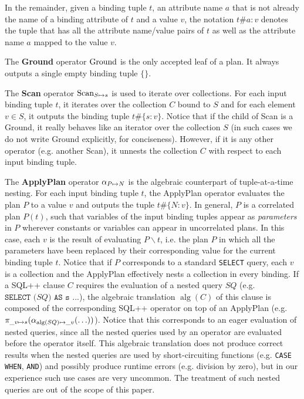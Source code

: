 In the remainder, given a binding tuple $t$, an attribute name $a$ that is not already the name of a binding attribute of $t$ and a value $v$, the notation $t\#{a : v}$ denotes the tuple that has all the attribute name/value pairs of $t$ as well as the attribute name $a$ mapped to the value $v$.

The \textbf{Ground} operator $\operatorname{Ground}$ is the only accepted leaf of a plan. It always outputs a single empty binding tuple $\{ \}$. 

The \textbf{Scan} operator $\operatorname{Scan}_{S \mapsto s}$ is used to iterate over collections. For each input binding tuple $t$, it iterates over the collection $C$ bound to $S$ and for each element $v \in S$, it outputs the binding tuple $t \# \{ s:v \}$. Notice that if the child of Scan is a Ground, it really behaves like an iterator over the collection $S$ (in such cases we do not write Ground explicitly, for conciseness). However, if it is any other operator (e.g. another Scan), it unnests the collection $C$ with respect to each input binding tuple.

The \textbf{ApplyPlan} operator $\alpha_{P \mapsto N}$ is the algebraic counterpart of tuple-at-a-time nesting. For each input binding tuple $t$, the ApplyPlan operator evaluates the plan $P$ to a value $v$ and outputs the tuple $t \# \{ N: v \}$. In general, $P$ is a correlated plan $P(t)$, such that variables of the input binding tuples appear as \textit{parameters} in $P$ wherever constants or variables can appear in uncorrelated plans. In this case, each $v$ is the result of evaluating $P\backslash t$, i.e. the plan $P$ in which all the parameters have been replaced by their corresponding value for the current binding tuple $t$. Notice that if $P$ corresponds to a standard \texttt{SELECT} query, each $v$ is a collection and the ApplyPlan effectively nests a collection in every binding. If a SQL++ clause $C$ requires the evaluation of a nested query $SQ$ (e.g. $\texttt{SELECT (}SQ\texttt{) AS s ...}$), the algebraic translation $\operatorname{alg}(C)$ of this clause is composed of the corresponding SQL++ operator on top of an ApplyPlan (e.g. $\pi_{\_v \mapsto s}(\alpha_{\operatorname{alg}(SQ) \mapsto \_v}(\ldots))$). Notice that this corresponds to an eager evaluation of nested queries, since all the nested queries used by an operator are evaluated before the operator itself. This algebraic translation does not produce correct results when the nested queries are used by short-circuiting functions (e.g. \texttt{CASE WHEN}, \texttt{AND}) and possibly produce runtime errors (e.g. division by zero), but in our experience such use cases are very uncommon. The treatment of such nested queries are out of the scope of this paper.

